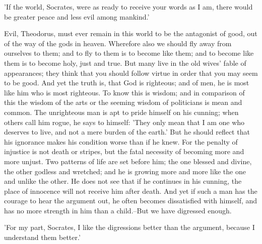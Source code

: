 'If the world, Socrates, were as ready to receive your words as I am,
there would be greater peace and less evil among mankind.'

Evil, Theodorus, must ever remain in this world to be the antagonist of
good, out of the way of the gods in heaven. Wherefore also we should fly
away from ourselves to them; and to fly to them is to become like them;
and to become like them is to become holy, just and true. But many
live in the old wives' fable of appearances; they think that you should
follow virtue in order that you may seem to be good. And yet the truth
is, that God is righteous; and of men, he is most like him who is most
righteous. To know this is wisdom; and in comparison of this the wisdom
of the arts or the seeming wisdom of politicians is mean and common. The
unrighteous man is apt to pride himself on his cunning; when others
call him rogue, he says to himself: 'They only mean that I am one who
deserves to live, and not a mere burden of the earth.' But he should
reflect that his ignorance makes his condition worse than if he knew.
For the penalty of injustice is not death or stripes, but the fatal
necessity of becoming more and more unjust. Two patterns of life are set
before him; the one blessed and divine, the other godless and wretched;
and he is growing more and more like the one and unlike the other. He
does not see that if he continues in his cunning, the place of innocence
will not receive him after death. And yet if such a man has the courage
to hear the argument out, he often becomes dissatisfied with himself,
and has no more strength in him than a child.--But we have digressed
enough.

'For my part, Socrates, I like the digressions better than the argument,
because I understand them better.'

